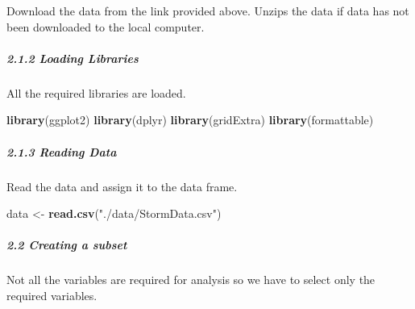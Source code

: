 \documentclass[]{article}
\newenvironment{Shaded}{\begin{snugshade}}{\end{snugshade}}
\newcommand{\ControlFlowTok}[1]{\textcolor[rgb]{0.13,0.29,0.53}{\textbf{#1}}}
\newcommand{\KeywordTok}[1]{\textcolor[rgb]{0.13,0.29,0.53}{\textbf{#1}}}
\newcommand{\NormalTok}[1]{#1}
\newcommand{\OperatorTok}[1]{\textcolor[rgb]{0.81,0.36,0.00}{\textbf{#1}}}
\newcommand{\StringTok}[1]{\textcolor[rgb]{0.31,0.60,0.02}{#1}}
\let\oldsubparagraph\subparagraph
\renewcommand{\subparagraph}[1]{\oldsubparagraph{#1}\mbox{}}
\begin{document}
Download the data from the link provided above. Unzips the data if data
has not been downloaded to the local computer.

\begin{Shaded}
\end{Shaded}

\hypertarget{loading-libraries}{%
\subparagraph{2.1.2 Loading Libraries}\label{loading-libraries}}

All the required libraries are loaded.

\begin{Shaded}
\begin{Highlighting}[]
\KeywordTok{library}\NormalTok{(ggplot2)}
\KeywordTok{library}\NormalTok{(dplyr)}
\KeywordTok{library}\NormalTok{(gridExtra)}
\KeywordTok{library}\NormalTok{(formattable)}
\end{Highlighting}
\end{Shaded}

\hypertarget{reading-data}{%
\subparagraph{2.1.3 Reading Data}\label{reading-data}}

Read the data and assign it to the data frame.

\begin{Shaded}
\begin{Highlighting}[]
\NormalTok{data <-}\StringTok{ }\KeywordTok{read.csv}\NormalTok{(}\StringTok{"./data/StormData.csv"}\NormalTok{)}
\end{Highlighting}
\end{Shaded}

\hypertarget{creating-a-subset}{%
\subparagraph{2.2 Creating a subset}\label{creating-a-subset}}

Not all the variables are required for analysis so we have to select
only the required variables.
\end{document}
